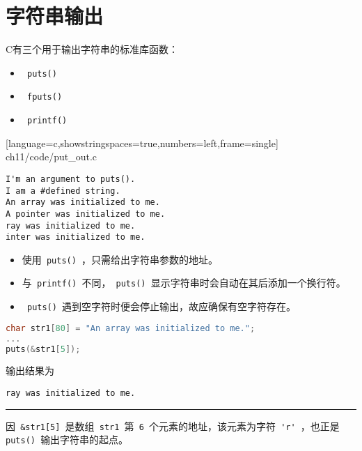 \section{字符串输出}

\begin{frame}[fragile] 
C有三个用于输出字符串的标准库函数：
\begin{itemize}
\item \lstinline| puts() |
\item \lstinline| fputs() |
\item \lstinline| printf() |
\end{itemize}
\end{frame}



\begin{frame} 

[language=c,showstringspaces=true,numbers=left,frame=single]
{ch11/code/put_out.c}
\end{frame}


\begin{frame}[fragile] 
\begin{lstlisting}[basicstyle=\ttfamily]
I'm an argument to puts().
I am a #defined string.
An array was initialized to me.
A pointer was initialized to me.
ray was initialized to me.
inter was initialized to me.
\end{lstlisting}
\end{frame}


\begin{frame}[fragile] 
\begin{itemize}
\item
使用\lstinline| puts() |，只需给出字符串参数的地址。 \\[0.1in]
\item 
与\lstinline| printf() |不同，\lstinline| puts() |显示字符串时会自动在其后添加一个换行符。\\[0.1in]
\item
\lstinline| puts() |遇到空字符时便会停止输出，故应确保有空字符存在。
\end{itemize}
\end{frame}

\begin{frame}[fragile] 
\begin{lstlisting}[language=c]
char str1[80] = "An array was initialized to me.";
...
puts(&str1[5]);
\end{lstlisting}
输出结果为
\begin{lstlisting}[basicstyle=\ttfamily]
ray was initialized to me.
\end{lstlisting}
\pause \rule{\textwidth}{0.3mm} \vspace{0.1mm}

因\lstinline| &str1[5] |是数组\lstinline| str1 |第\lstinline| 6 |个元素的地址，该元素为字符\lstinline| 'r' |，也正是\lstinline| puts() |输出字符串的起点。
\end{frame}

